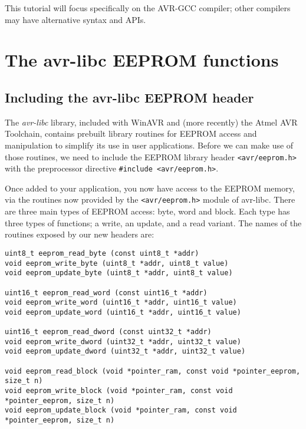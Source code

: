 \documentclass[a4paper,oneside,notitlepage]{book}
\begin{document}
This tutorial will focus specifically on the AVR-GCC compiler; other compilers may have alternative syntax and APIs.


\chapter{The avr-libc EEPROM functions}

\section{Including the avr-libc EEPROM header}

The \textit{avr-libc} library, included with WinAVR and (more recently) the Atmel AVR Toolchain, contains prebuilt library routines for EEPROM access and manipulation to simplify its use in user applications. Before we can make use of those routines, we need to include the EEPROM library header \lstinline{<avr/eeprom.h>} with the preprocessor directive \lstinline{#include <avr/eeprom.h>}.

Once added to your application, you now have access to the EEPROM memory, via the routines now provided by the \lstinline{<avr/eeprom.h>} module of avr-libc. There are three main types of EEPROM access: byte, word and block. Each type has three types of functions; a write, an update, and a read variant. The names of the routines exposed by our new headers are:

\begin{center}
\begin{lstlisting}
uint8_t eeprom_read_byte (const uint8_t *addr)
void eeprom_write_byte (uint8_t *addr, uint8_t value)
void eeprom_update_byte (uint8_t *addr, uint8_t value)

uint16_t eeprom_read_word (const uint16_t *addr)
void eeprom_write_word (uint16_t *addr, uint16_t value)
void eeprom_update_word (uint16_t *addr, uint16_t value)

uint16_t eeprom_read_dword (const uint32_t *addr)
void eeprom_write_dword (uint32_t *addr, uint32_t value)
void eeprom_update_dword (uint32_t *addr, uint32_t value)

void eeprom_read_block (void *pointer_ram, const void *pointer_eeprom, size_t n)
void eeprom_write_block (void *pointer_ram, const void *pointer_eeprom, size_t n)
void eeprom_update_block (void *pointer_ram, const void *pointer_eeprom, size_t n)
\end{lstlisting}
\end{center}
\end{document}
